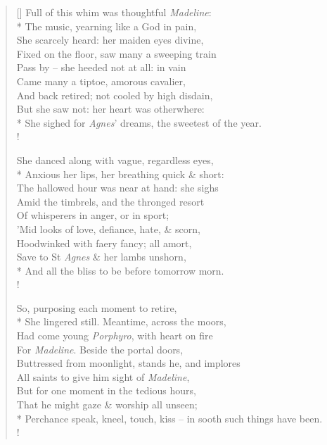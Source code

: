 \documentclass[MAIN]{subfiles}
\begin{document}
\begin{verse}[\versewidth]
\vin Full of this whim was thoughtful \emph{Madeline}:\\*
\vin The music, yearning like a God in pain,\\
\vin She scarcely heard: her maiden eyes divine,\\
\vin Fixed on the floor, saw many a sweeping train\\
\vin Pass by -- she heeded not at all: in vain\\
\vin Came many a tiptoe, amorous cavalier,\\
\vin And back retired; not cooled by high disdain,\\
\vin But she saw not: her heart was otherwhere:\\*
She sighed for \emph{Agnes}' dreams, the sweetest of the year.\\!

\vin She danced along with vague, regardless eyes,\\*
\vin Anxious her lips, her breathing quick \& short:\\ 
\vin The hallowed hour was near at hand: she sighs\\
\vin Amid the timbrels, and the thronged resort\\
\vin Of whisperers in anger, or in sport;\\
\vin 'Mid looks of love, defiance, hate, \& scorn,\\
\vin Hoodwinked with faery fancy; all amort,\\
\vin Save to St \emph{Agnes} \& her lambs unshorn,\\*
And all the bliss to be before tomorrow morn.\\!

\vin So, purposing each moment to retire,\\*
\vin She lingered still. Meantime, across the moors,\\
\vin Had come young \emph{Porphyro}, with heart on fire\\
\vin For \emph{Madeline}. Beside the portal doors,\\
\vin Buttressed from moonlight, stands he, and implores\\
\vin All saints to give him sight of \emph{Madeline},\\
\vin But for one moment in the tedious hours,\\
\vin That he might gaze \& worship all unseen;\\*
Perchance speak, kneel, touch, kiss -- in sooth such things have been.\\!


\end{verse}
\end{document}
